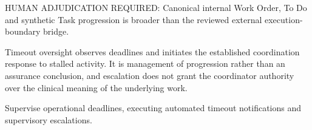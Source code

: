 HUMAN ADJUDICATION REQUIRED: Canonical internal Work Order, To Do and synthetic Task progression is broader than the reviewed external execution-boundary bridge.



Timeout oversight observes deadlines and initiates the established coordination response to stalled activity. It is management of progression rather than an assurance conclusion, and escalation does not grant the coordinator authority over the clinical meaning of the underlying work.



Supervise operational deadlines, executing automated timeout notifications and supervisory escalations.


